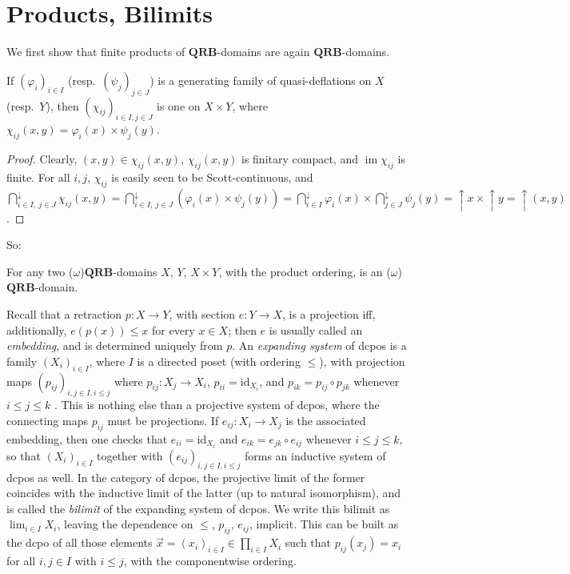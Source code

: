 \documentclass{LMCS}
\newcommand\img{\mathop{\mathrm{im}}}
\newcommand\upc{\mathop{\uparrow}\nolimits}
\newcommand\QRB{\mathbf{QRB}}
\newcommand{\identity}[1]{\mathrm{id}_{#1}}
\begin{document}
\section{Products, Bilimits}
\label{sec:bilim}

We first show that finite products of $\QRB$-domains are again
$\QRB$-domains.
\begin{lem}
  \label{lem:qrb:prod}
  If ${(\varphi_i)}_{i \in I}$ (resp.\ ${(\psi_j)}_{j \in J}$) is a
  generating family of quasi-deflations on $X$ (resp.\ $Y$), then
  ${(\chi_{ij})}_{i \in I, j \in J}$ is one on $X \times Y$, where
  $\chi_{ij} (x,y) = \varphi_i (x) \times \psi_j (y)$.
\end{lem}
\begin{proof}
Clearly, $(x,y) \in \chi_{ij} (x,y)$, $\chi_{ij} (x, y)$ is finitary
  compact, and $\img \chi_{ij}$ is finite.  For all $i, j$,
  $\chi_{ij}$ is easily seen to be Scott-continuous, and $\bigcap_{i
    \in I,\: j \in J}^\downarrow \chi_{ij} (x,y) = \bigcap_{i \in I,\: j
    \in J}^\downarrow (\varphi_i (x) \times \psi_j (y)) = \bigcap_{i
    \in I}^\downarrow \varphi_i (x) \times \bigcap_{j \in
    J}^\downarrow \psi_j (y) = \upc x \times \upc y = \upc (x,y)$.
\end{proof}
So:
\begin{lem}
  \label{lemma:qrb:prod}
  For any two ($\omega$)$\QRB$-domains $X$, $Y$, $X \times Y$, with
  the product ordering, is an ($\omega$)$\QRB$-domain.
\end{lem}

Recall that a retraction $p : X \to Y$, with section $e : Y \to X$, is
a projection iff, additionally, $e (p (x)) \leq x$ for every $x \in
X$; then $e$ is usually called an {\em embedding\/}, and is determined
uniquely from $p$.  An \emph{expanding system} of dcpos is a family
${(X_i)}_{i \in I}$, where $I$ is a directed poset (with ordering
$\leq$), with projection maps ${(p_{ij})}_{i,j\in I, i\leq j}$ where
$p_{ij} : X_j \to X_i$, $p_{ii} = \identity {X_i}$, and $p_{ik} =
p_{ij} \circ p_{jk}$ whenever $i\leq j\leq k$
\cite[Section~3.3.2]{AJ:domains}. This is nothing else than a
projective system of dcpos, where the connecting maps $p_{ij}$ must be
projections.  If $e_{ij} : X_i \to X_j$ is the associated embedding,
then one checks that $e_{ii} = \identity {X_i}$ and $e_{ik} = e_{jk}
\circ e_{ij}$ whenever $i \leq j \leq k$, so that ${(X_i)}_{i \in I}$
together with ${(e_{ij})}_{i, j \in I, i \leq j}$ forms an inductive
system of dcpos as well.  In the category of dcpos, the projective
limit of the former coincides with the inductive limit of the latter
(up to natural isomorphism), and is called the \emph{bilimit} of the
expanding system of dcpos.  We write this bilimit as $\lim_{i \in I}
X_i$, leaving the dependence on $\leq$, $p_{ij}$, $e_{ij}$, implicit.
This can be built as the dcpo of all those elements $\vec x =
{(x_i)}_{i \in I} \in \prod_{i \in I} X_i$ such that $p_{ij} (x_j) =
x_i$ for all $i, j \in I$ with $i \leq j$, with the componentwise
ordering.
\end{document}
